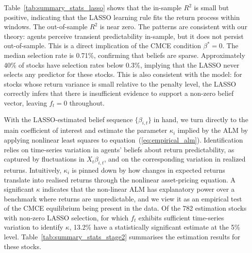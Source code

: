 Table~\ref{tab:summary_stats_lasso} shows that the in-sample $R^2$ is small but positive, indicating that the LASSO learning rule fits the return process within windows.
The out-of-sample $R^2$ is near zero.
The patterns are consistent with our theory: agents perceive transient predictability in-sample, but it does not persist out-of-sample.
This is a direct implication of the CMCE condition $\beta^* = 0$.
The median selection rate is 0.71\%, confirming that beliefs are sparse.
Approximately 40\% of stocks have selection rates below 0.3\%, implying that the LASSO never selects any predictor for these stocks.
This is also consistent with the model: for stocks whose return variance is small relative to the penalty level, the LASSO correctly infers that there is insufficient evidence to support a non-zero belief vector, leaving $f_t = 0$ throughout.

With the LASSO-estimated belief sequence $\{\beta_{i,t}\}$ in hand, we turn directly to the main coefficient of interest and estimate the parameter $\kappa_{i}$ implied by the ALM by applying nonlinear least squares to equation~(\ref{eq:empirical_alm}).
Identification relies on time-series variation in agents’ beliefs about return predictability, as captured by fluctuations in $X_t \beta_{i,t}$, and on the corresponding variation in realized returns.
Intuitively, $\kappa_{i}$ is pinned down by how changes in expected returns translate into realised returns through the nonlinear asset-pricing equation.
A significant $\kappa$ indicates that the non-linear ALM has explanatory power over a benchmark where returns are unpredictable, and we view it as an empirical test of the CMCE equilibrium being present in the data.
Of the 782 estimation stocks with non-zero LASSO selection, for which $f_t$ exhibits sufficient time-series variation to identify $\kappa$, 13.2\% have a statistically significant estimate at the 5\% level.
Table~\ref{tab:summary_stats_stage2} summarises the estimation results for these stocks.


